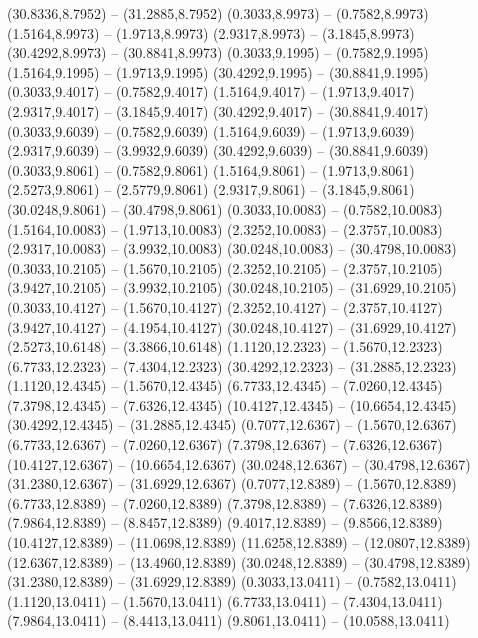 {\begin{scope}[shift={(#1,#2)}]
    (30.8336,8.7952) -- (31.2885,8.7952)
    (0.3033,8.9973) -- (0.7582,8.9973)
    (1.5164,8.9973) -- (1.9713,8.9973)
    (2.9317,8.9973) -- (3.1845,8.9973)
    (30.4292,8.9973) -- (30.8841,8.9973)
    (0.3033,9.1995) -- (0.7582,9.1995)
    (1.5164,9.1995) -- (1.9713,9.1995)
    (30.4292,9.1995) -- (30.8841,9.1995)
    (0.3033,9.4017) -- (0.7582,9.4017)
    (1.5164,9.4017) -- (1.9713,9.4017)
    (2.9317,9.4017) -- (3.1845,9.4017)
    (30.4292,9.4017) -- (30.8841,9.4017)
    (0.3033,9.6039) -- (0.7582,9.6039)
    (1.5164,9.6039) -- (1.9713,9.6039)
    (2.9317,9.6039) -- (3.9932,9.6039)
    (30.4292,9.6039) -- (30.8841,9.6039)
    (0.3033,9.8061) -- (0.7582,9.8061)
    (1.5164,9.8061) -- (1.9713,9.8061)
    (2.5273,9.8061) -- (2.5779,9.8061)
    (2.9317,9.8061) -- (3.1845,9.8061)
    (30.0248,9.8061) -- (30.4798,9.8061)
    (0.3033,10.0083) -- (0.7582,10.0083)
    (1.5164,10.0083) -- (1.9713,10.0083)
    (2.3252,10.0083) -- (2.3757,10.0083)
    (2.9317,10.0083) -- (3.9932,10.0083)
    (30.0248,10.0083) -- (30.4798,10.0083)
    (0.3033,10.2105) -- (1.5670,10.2105)
    (2.3252,10.2105) -- (2.3757,10.2105)
    (3.9427,10.2105) -- (3.9932,10.2105)
    (30.0248,10.2105) -- (31.6929,10.2105)
    (0.3033,10.4127) -- (1.5670,10.4127)
    (2.3252,10.4127) -- (2.3757,10.4127)
    (3.9427,10.4127) -- (4.1954,10.4127)
    (30.0248,10.4127) -- (31.6929,10.4127)
    (2.5273,10.6148) -- (3.3866,10.6148)
    (1.1120,12.2323) -- (1.5670,12.2323)
    (6.7733,12.2323) -- (7.4304,12.2323)
    (30.4292,12.2323) -- (31.2885,12.2323)
    (1.1120,12.4345) -- (1.5670,12.4345)
    (6.7733,12.4345) -- (7.0260,12.4345)
    (7.3798,12.4345) -- (7.6326,12.4345)
    (10.4127,12.4345) -- (10.6654,12.4345)
    (30.4292,12.4345) -- (31.2885,12.4345)
    (0.7077,12.6367) -- (1.5670,12.6367)
    (6.7733,12.6367) -- (7.0260,12.6367)
    (7.3798,12.6367) -- (7.6326,12.6367)
    (10.4127,12.6367) -- (10.6654,12.6367)
    (30.0248,12.6367) -- (30.4798,12.6367)
    (31.2380,12.6367) -- (31.6929,12.6367)
    (0.7077,12.8389) -- (1.5670,12.8389)
    (6.7733,12.8389) -- (7.0260,12.8389)
    (7.3798,12.8389) -- (7.6326,12.8389)
    (7.9864,12.8389) -- (8.8457,12.8389)
    (9.4017,12.8389) -- (9.8566,12.8389)
    (10.4127,12.8389) -- (11.0698,12.8389)
    (11.6258,12.8389) -- (12.0807,12.8389)
    (12.6367,12.8389) -- (13.4960,12.8389)
    (30.0248,12.8389) -- (30.4798,12.8389)
    (31.2380,12.8389) -- (31.6929,12.8389)
    (0.3033,13.0411) -- (0.7582,13.0411)
    (1.1120,13.0411) -- (1.5670,13.0411)
    (6.7733,13.0411) -- (7.4304,13.0411)
    (7.9864,13.0411) -- (8.4413,13.0411)
    (9.8061,13.0411) -- (10.0588,13.0411)

\end{scope}}

